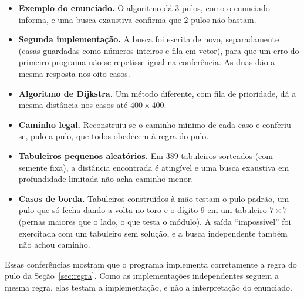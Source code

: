 \begin{itemize}
  \item \textbf{Exemplo do enunciado.} O algoritmo dá 3 pulos, como o enunciado informa, e uma
    busca exaustiva confirma que 2 pulos não bastam.
  \item \textbf{Segunda implementação.} A busca foi escrita de novo, separadamente (casas
    guardadas como números inteiros e fila em vetor), para que um erro do primeiro programa não
    se repetisse igual na conferência. As duas dão a mesma resposta nos oito casos.
  \item \textbf{Algoritmo de Dijkstra.} Um método diferente, com fila de prioridade, dá a
    mesma distância nos casos até $400 \times 400$.
  \item \textbf{Caminho legal.} Reconstruiu-se o caminho mínimo de cada caso e conferiu-se, pulo
    a pulo, que todos obedecem à regra do pulo.
  \item \textbf{Tabuleiros pequenos aleatórios.} Em 389 tabuleiros sorteados (com semente
    fixa), a distância encontrada é atingível e uma busca exaustiva em profundidade limitada
    não acha caminho menor.
  \item \textbf{Casos de borda.} Tabuleiros construídos à mão testam o pulo padrão, um pulo
    que só fecha dando a volta no toro e o dígito 9 em um tabuleiro $7 \times 7$ (pernas
    maiores que o lado, o que testa o módulo). A saída ``impossível'' foi exercitada com um
    tabuleiro sem solução, e a busca independente também não achou caminho.
\end{itemize}

Essas conferências mostram que o programa implementa corretamente a regra do pulo da
Seção~\ref{sec:regra}. Como as implementações independentes seguem a mesma regra, elas testam a
implementação, e não a interpretação do enunciado.
